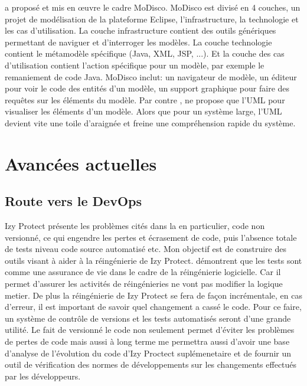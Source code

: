 \documentclass[a4paper]{article}
\begin{document}
\citet{Brun14c} a proposé et mis en œuvre le cadre MoDisco.
MoDisco est divisé en 4 couches, un projet de modélisation de la plateforme Eclipse, l'infrastructure, la technologie et les cas d'utilisation.
La couche infrastructure contient des outils génériques permettant de naviguer et d'interroger les modèles.
La couche technologie contient le métamodèle spécifique (Java, XML, JSP, ...).
Et la couche des cas d'utilisation contient l'action spécifique pour un modèle, par exemple le remaniement de code Java.
MoDisco inclut: un navigateur de modèle, un éditeur pour voir le code des entités d'un modèle, un support graphique pour faire des requêtes sur les éléments du modèle. 
Par contre \citet{Brun14c}, ne propose que l'UML pour visualiser les éléments d'un modèle.
Alors que pour un système large, l'UML devient vite une toile d'araignée et freine une compréhension rapide du système.

\section{Avancées actuelles}
\subsection{Route vers le DevOps}
\label{sec: devOps}

Izy Protect présente les problèmes cités dans la  en particulier, code non versionné, ce qui engendre les pertes et écrasement de code, puis l'absence totale de tests niveau code source automatisé etc.
Mon objectif est de construire des outils visant à aider  à la réingénierie de Izy Protect.
\citet{Deme02a} démontrent  que les tests sont comme une assurance de vie dans le cadre de la réingénierie logicielle. 
Car il permet d'assurer les activités de réingénieries ne vont pas modifier la logique metier.  
De plus la réingénierie de Izy Protect se fera de façon incrémentale, en cas d'erreur, il est important de savoir quel changement a cassé le code.
Pour ce faire, un système de contrôle de versions et les tests automatisés seront d'une grande utilité.
Le fait de versionné le code  non seulement permet d'éviter les problèmes de pertes de code mais aussi à long terme me permettra aussi 
d'avoir une base d'analyse de l'évolution du code d'Izy Proctect suplémenetaire et de fournir  un outil de vérification des normes de développements sur les changements effectués par les développeurs.
\end{document}
